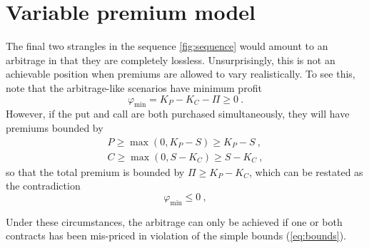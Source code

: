 \documentclass[aps,reprint]{revtex4-2}
\begin{document}
\section{Variable premium model}

The final two strangles in the sequence \ref{fig:sequence} would amount to an arbitrage in that they are completely lossless.  Unsurprisingly, this is not an achievable position when premiums are allowed to vary realistically.  To see this, note that the arbitrage-like scenarios have minimum profit
\begin{equation}
\varphi_{\min} = K_P - K_C - \Pi \geq 0~.
\end{equation}
However, if the put and call are both purchased simultaneously, they will have premiums bounded by 
\begin{subequations} \label{eq:bounds}
\begin{align}
P \geq \max(0, K_P - S) \geq K_P - S~,\\
C \geq \max(0, S - K_C) \geq S - K_C~,
\end{align}
\end{subequations}
so that the total premium is bounded by $\Pi \geq K_P - K_C$, which can be restated as the contradiction
\begin{equation}
\varphi_{\min} \leq 0~,
\end{equation}

Under these circumstances, the arbitrage can only be achieved if one or both contracts has been mis-priced in violation of the simple bounds (\ref{eq:bounds}).  
\end{document}
